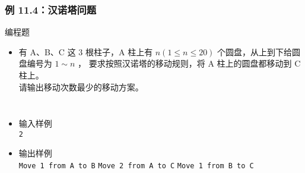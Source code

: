 \begin{frame}[fragile]
    \frametitle{例 11.4：汉诺塔问题}
    
    \begin{exampleblock}{编程题}
        \begin{itemize}
            \item 有 A、B、C 这 $3$ 根柱子，A 柱上有 $n (1 \le n \le 20)$ 个圆盘，从上到下给圆盘编号为 $1 \sim n$ ，
                要求按照汉诺塔的移动规则，将 A 柱上的圆盘都移动到 C 柱上。\\
                请输出移动次数最少的移动方案。
        \end{itemize}

        \vspace{1em}

        \begin{columns}


            \begin{itemize}
                \item 输入样例\\
                    \lstinline|2|
                \item 输出样例\\
                    \lstinline|Move 1 from A to B|
                    \lstinline|Move 2 from A to C|
                    \lstinline|Move 1 from B to C|
            \end{itemize}

\end{columns}
\end{exampleblock}
\end{frame}
